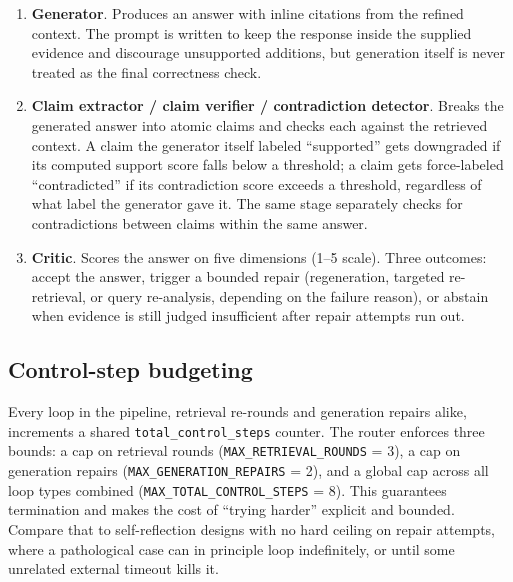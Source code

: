 \documentclass[conference]{IEEEtran}
\begin{document}
\begin{enumerate}
to cut redundant context before generation. One protection matters here: any passage
that uniquely covers a keyword from an unmet evidence requirement is never dropped as
redundant, even if it looks topically similar to something already kept. Without that
rule, the refiner would happily throw away the one passage that actually answers a
sub-requirement in favor of a more generic look-alike.
\item \textbf{Generator}. Produces an answer with inline citations from the refined
context. The prompt is written to keep the response inside the supplied evidence and
discourage unsupported additions, but generation itself is never treated as the final
correctness check.
\item \textbf{Claim extractor / claim verifier / contradiction detector}. Breaks the
generated answer into atomic claims and checks each against the retrieved context. A
claim the generator itself labeled ``supported'' gets downgraded if its computed
support score falls below a threshold; a claim gets force-labeled ``contradicted'' if
its contradiction score exceeds a threshold, regardless of what label the generator
gave it. The same stage separately checks for contradictions between claims within the
same answer.
\item \textbf{Critic}. Scores the answer on five dimensions (1--5 scale). Three
outcomes: accept the answer, trigger a bounded repair (regeneration, targeted
re-retrieval, or query re-analysis, depending on the failure reason), or abstain when
evidence is still judged insufficient after repair attempts run out.
\end{enumerate}

\subsection{Control-step budgeting}

Every loop in the pipeline, retrieval re-rounds and generation repairs alike,
increments a shared \texttt{total\_control\_steps} counter. The router enforces three
bounds: a cap on retrieval rounds (\texttt{MAX\_RETRIEVAL\_ROUNDS} = 3), a cap on
generation repairs (\texttt{MAX\_GENERATION\_REPAIRS} = 2), and a global cap across all
loop types combined (\texttt{MAX\_TOTAL\_CONTROL\_STEPS} = 8). This guarantees
termination and makes the cost of ``trying harder'' explicit and bounded. Compare that
to self-reflection designs with no hard ceiling on repair attempts, where a
pathological case can in principle loop indefinitely, or until some unrelated external
timeout kills it.
\end{document}
